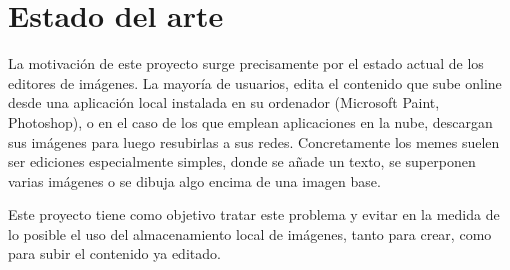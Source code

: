 \chapter{Estado del arte}

La motivación de este proyecto surge precisamente por el estado actual de los editores de imágenes. 
La mayoría de usuarios, edita el contenido que sube online desde una aplicación local instalada en 
su ordenador (Microsoft Paint, Photoshop), o en el caso de los que emplean aplicaciones en la nube, 
descargan sus imágenes para luego resubirlas a sus redes.
Concretamente los memes suelen ser ediciones especialmente simples, donde se añade un texto, 
se superponen varias imágenes o se dibuja algo encima de una imagen base.

Este proyecto tiene como objetivo tratar este problema y evitar en la medida de lo posible el uso 
del almacenamiento local de imágenes, tanto para crear, como para subir el contenido ya editado. 

